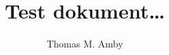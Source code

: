 \documentclass[a4paper,12pt,  twoside, openright,draft]{memoir}
\title{Test dokument\ldots}
\author{Thomas M. Amby}
\begin{document}
\maketitle

\frontmatter
\tableofcontents

 \mainmatter










\backmatter
\nocite{*}

\end{document}
